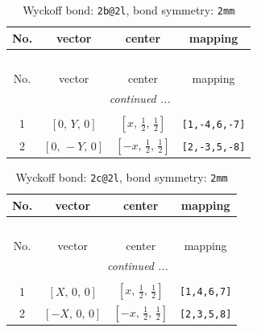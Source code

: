 \documentclass[fleqn,8pt]{jsarticle}
\begin{document}
\renewcommand{\arraystretch}{1.2}
\begin{longtable}{cccc}
\caption{Wyckoff bond: {\tt 2b@2l}, bond symmetry: {\tt 2mm}}
 \\
 \hline \hline
No. & vector & center & mapping \\ \hline \endfirsthead

\multicolumn{3}{l}{\tablename\ \thetable{}} \\
 \hline \hline
No. & vector & center & mapping \\ \hline \endhead

 \hline \hline
\multicolumn{3}{r}{\footnotesize\it continued ...} \\ \endfoot

 \hline \hline
\multicolumn{3}{r}{} \\ \endlastfoot

1 & $\left[ 0,\, Y,\, 0 \right]$ & $\left[ x,\, \frac{1}{2},\, \frac{1}{2} \right]$ & {\tt [1,-4,6,-7]} \\ \hline
2 & $\left[ 0,\, - Y,\, 0 \right]$ & $\left[ - x,\, \frac{1}{2},\, \frac{1}{2} \right]$ & {\tt [2,-3,5,-8]} \\
\end{longtable}
\renewcommand{\arraystretch}{1.2}
\begin{longtable}{cccc}
\caption{Wyckoff bond: {\tt 2c@2l}, bond symmetry: {\tt 2mm}}
 \\
 \hline \hline
No. & vector & center & mapping \\ \hline \endfirsthead

\multicolumn{3}{l}{\tablename\ \thetable{}} \\
 \hline \hline
No. & vector & center & mapping \\ \hline \endhead

 \hline \hline
\multicolumn{3}{r}{\footnotesize\it continued ...} \\ \endfoot

 \hline \hline
\multicolumn{3}{r}{} \\ \endlastfoot

1 & $\left[ X,\, 0,\, 0 \right]$ & $\left[ x,\, \frac{1}{2},\, \frac{1}{2} \right]$ & {\tt [1,4,6,7]} \\ \hline
2 & $\left[ - X,\, 0,\, 0 \right]$ & $\left[ - x,\, \frac{1}{2},\, \frac{1}{2} \right]$ & {\tt [2,3,5,8]} \\
\end{longtable}
\renewcommand{\arraystretch}{1.2}
\end{document}
